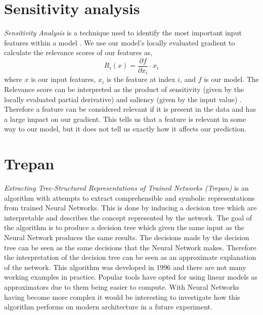 \section{Sensitivity analysis}
\emph{Sensitivity Analysis} \cite{DBLP:journals/corr/MontavonSM17} is a technique used to identify the most important input features within a model \cite{Zhou2008}. We use our model's locally evaluated gradient to calculate the relevance scores of our features as,
\begin{equation}
    R_{i}(x) = \frac{\partial f}{\partial x_{i}} \cdot x_{i}
\end{equation}
where  $x$ is our input features, $x_{i}$ is the feature at index $i$, and $f$ is our model. The Relevance score can be interpreted as the product of sensitivity (given by the locally evaluated partial derivative) and saliency (given by the input value) \cite{DBLP:journals/corr/MontavonSM17}. Therefore a feature can be considered relevant if it is present in the data and has a large impact on our gradient. This tells us that a feature is relevant in some way to our model, but it does not tell us exactly how it affects our prediction.

\section{Trepan}
\emph{Extracting Tree-Structured Representations of Trained Networks (Trepan)} \cite{Craven1995ExtractingTR} is an algorithm with attempts to extract comprehensible and symbolic representations from trained Neural Networks. This is done by inducing a decision tree \cite{articleb} which are interpretable and describes the concept represented by the network. The goal of the algorithm is to produce a decision tree which given the same input as the Neural Network produces the same results. The decisions made by the decision tree can be seen as the same decisions that the Neural Network makes. Therefore the interpretation of the decision tree can be seen as an approximate explanation of the network.  This algorithm was developed in 1996 and there are not many working examples in practice. Popular tools have opted for using linear models as approximators due to them being easier to compute. With Neural Networks having become more complex it would be interesting to investigate how this algorithm performs on modern architecture in a future experiment.

